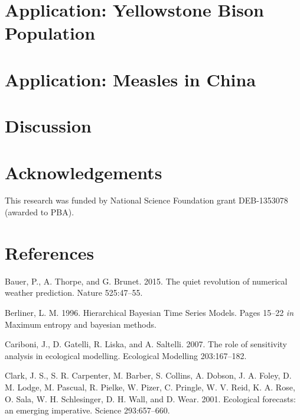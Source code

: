 \documentclass[12pt,]{article}
\begin{document}
\hypertarget{application-yellowstone-bison-population}{%
\section{Application: Yellowstone Bison
Population}\label{application-yellowstone-bison-population}}

\hypertarget{application-measles-in-china}{%
\section{Application: Measles in
China}\label{application-measles-in-china}}

\hypertarget{discussion}{%
\section{Discussion}\label{discussion}}

\hypertarget{acknowledgements}{%
\section{Acknowledgements}\label{acknowledgements}}

This research was funded by National Science Foundation grant
DEB-1353078 (awarded to PBA).

\setlength{\parindent}{0pt}

\hypertarget{references}{%
\section{References}\label{references}}

\hypertarget{refs}{}
\leavevmode\hypertarget{ref-Bauer2015}{}%
Bauer, P., A. Thorpe, and G. Brunet. 2015. The quiet revolution of
numerical weather prediction. Nature 525:47--55.

\leavevmode\hypertarget{ref-Berliner1996}{}%
Berliner, L. M. 1996. Hierarchical Bayesian Time Series Models. Pages
15--22 \emph{in} Maximum entropy and bayesian methods.

\leavevmode\hypertarget{ref-Cariboni2007}{}%
Cariboni, J., D. Gatelli, R. Liska, and A. Saltelli. 2007. The role of
sensitivity analysis in ecological modelling. Ecological Modelling
203:167--182.

\leavevmode\hypertarget{ref-Clark2001}{}%
Clark, J. S., S. R. Carpenter, M. Barber, S. Collins, A. Dobson, J. A.
Foley, D. M. Lodge, M. Pascual, R. Pielke, W. Pizer, C. Pringle, W. V.
Reid, K. A. Rose, O. Sala, W. H. Schlesinger, D. H. Wall, and D. Wear.
2001. Ecological forecasts: an emerging imperative. Science
293:657--660.
\end{document}
